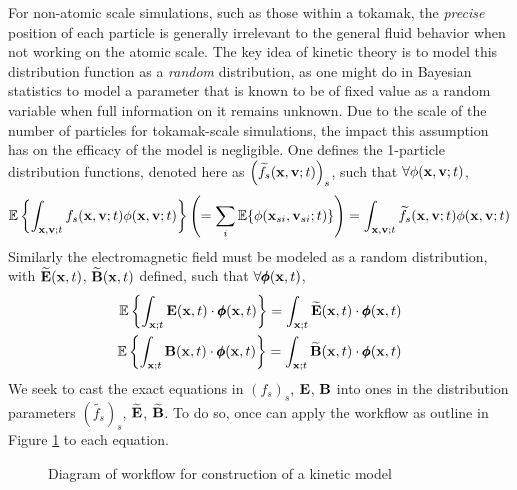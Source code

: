     For non-atomic scale simulations, such as those within a tokamak, the \emph{precise} position of each particle is generally irrelevant to the general fluid behavior when not working on the atomic scale. The key idea of kinetic theory is to model this distribution function as a \emph{random} distribution, as one might do in Bayesian statistics to model a parameter that is known to be of fixed value as a random variable when full information on it remains unknown. Due to the scale of the number of particles for tokamak-scale simulations, the impact this assumption has on the efficacy of the model is negligible. One defines the 1-particle distribution functions, denoted here as $\left(\widetilde{f_{s}}(\mathbf{x}, \mathbf{v}; t)\right)_{s}$, such that $\forall \phi(\mathbf{x}, \mathbf{v}; t)$,
    \begin{equation}
        \mathbb{E}\left\{\int_{\mathbf{x}, \mathbf{v}; t}f_{s}(\mathbf{x}, \mathbf{v}; t)\phi(\mathbf{x}, \mathbf{v}; t)\right\}
        \left(=  \sum_{i}\mathbb{E}\{\phi(\mathbf{x}_{si}, \mathbf{v}_{si}; t)\}\right)
        =  \int_{\mathbf{x}, \mathbf{v}; t}\widetilde{f_{s}}(\mathbf{x}, \mathbf{v}; t)\phi(\mathbf{x}, \mathbf{v};t )
    \end{equation}
    Similarly the electromagnetic field must be modeled as a random distribution, with $\widetilde{\mathbf{E}}(\mathbf{x}, t)$, $\widetilde{\mathbf{B}}(\mathbf{x}, t)$ defined, such that $\forall \pmb{\mathsf{\phi}}(\mathbf{x}, t)$,
    \begin{align}
        \mathbb{E}\left\{\int_{\mathbf{x}; t}\mathbf{E}(\mathbf{x}, t)\cdot\pmb{\mathsf{\phi}}(\mathbf{x}, t)\right\}  =  \int_{\mathbf{x}; t}\widetilde{\mathbf{E}}(\mathbf{x}, t)\cdot\pmb{\mathsf{\phi}}(\mathbf{x}, t)  \\ 
        \mathbb{E}\left\{\int_{\mathbf{x}; t}\mathbf{B}(\mathbf{x}, t)\cdot\pmb{\mathsf{\phi}}(\mathbf{x}, t)\right\}  =  \int_{\mathbf{x}; t}\widetilde{\mathbf{B}}(\mathbf{x}, t)\cdot\pmb{\mathsf{\phi}}(\mathbf{x}, t)
    \end{align}
    We seek to cast the exact equations in $(f_{s})_{s}$, $\mathbf{E}$, $\mathbf{B}$ into ones in the distribution parameters $(\widetilde{f_{s}})_{s}$, $\widetilde{\mathbf{E}}$, $\widetilde{\mathbf{B}}$. To do so, once can apply the workflow as outline in Figure \ref{fig:kinetic model construction workflow} to each equation.
    \begin{figure}[!ht]
        \centering
        \caption{Diagram of workflow for construction of a kinetic model}
        \label{fig:kinetic model construction workflow}
    \end{figure}

